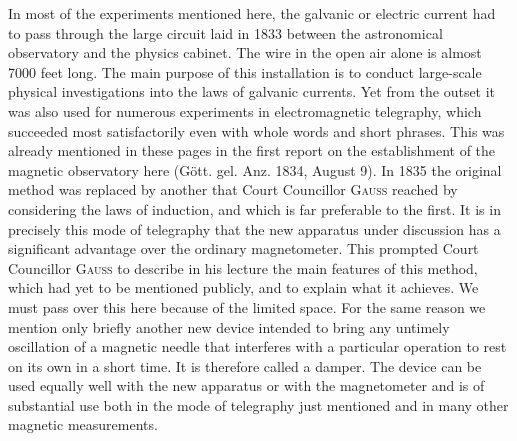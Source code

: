 In most of the experiments mentioned here, the galvanic or electric current had to pass through the large circuit laid in 1833 between the astronomical observatory and the physics cabinet. The wire in the open air alone is almost 7000 feet long. The main purpose of this installation is to conduct large-scale physical investigations into the laws of galvanic currents. Yet from the outset it was also used for numerous experiments in electromagnetic telegraphy, which succeeded most satisfactorily even with whole words and short phrases. This was already mentioned in these pages in the first report on the establishment of the magnetic observatory here (Gött. gel. Anz. 1834, August 9). In 1835 the original method was replaced by another that Court Councillor \textsc{Gauss} reached by considering the laws of induction, and which is far preferable to the first. It is in precisely this mode of telegraphy that the new apparatus under discussion has a significant advantage over the ordinary magnetometer. This prompted Court Councillor \textsc{Gauss} to describe in his lecture the main features of this method, which had yet to be mentioned publicly, and to explain what it achieves. We must pass over this here because of the limited space. For the same reason we mention only briefly another new device intended to bring any untimely oscillation of a magnetic needle that interferes with a particular operation to rest on its own in a short time. It is therefore called a damper. The device can be used equally well with the new apparatus or with the magnetometer and is of substantial use both in the mode of telegraphy just mentioned and in many other magnetic measurements.

